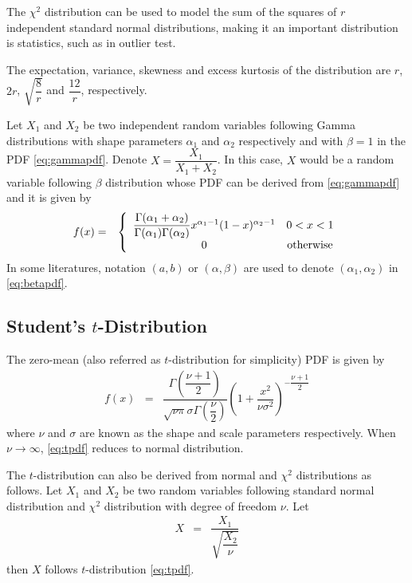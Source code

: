 The $\chi^2$ distribution can be used to model the sum of the squares of $r$ independent standard normal distributions, making it an important distribution is statistics, such as in outlier test. 

The expectation, variance, skewness and excess kurtosis of the distribution are $r$, $2r$, $\sqrt{\dfrac{8}{r}}$ and $\dfrac{12}{r}$, respectively.

Let $X_1$ and $X_2$ be two independent random variables following Gamma distributions with shape parameters $\alpha_1$ and $\alpha_2$ respectively and with $\beta = 1$ in the PDF \eqref{eq:gammapdf}. Denote $X=\dfrac{X_1}{X_1+X_2}$. In this case, $X$ would be a random variable following $\beta$ distribution whose PDF can be derived from \eqref{eq:gammapdf} and it is given by
\begin{eqnarray}
  f(x) &=& \left\{\begin{array}{cc}
                    \dfrac{\Gamma(\alpha_1 + \alpha_2)}{\Gamma(\alpha_1)\Gamma(\alpha_2)}x^{\alpha_1-1}(1-x)^{\alpha_2-1} & 0 < x < 1 \\
                    0 & \textup{otherwise}
                  \end{array}\right. \label{eq:betapdf}
\end{eqnarray}
In some literatures, notation $(a, b)$ or $(\alpha, \beta)$ are used to denote $(\alpha_1, \alpha_2)$ in \eqref{eq:betapdf}.

\subsection{Student's $t$-Distribution}

The zero-mean  (also referred as $t$-distribution for simplicity) PDF is given by
\begin{eqnarray}
	f(x) &=& \dfrac{\Gamma\left(\dfrac{\nu+1}{2}\right)}{\sqrt{\nu\pi}\sigma\Gamma\left(\dfrac{\nu}{2}\right)}\left(1+\dfrac{x^2}{\nu\sigma^2}\right)^{-\dfrac{\nu+1}{2}} \label{eq:tpdf}
\end{eqnarray}
where $\nu$ and $\sigma$ are known as the shape and scale parameters respectively. When $\nu\rightarrow\infty$, \eqref{eq:tpdf} reduces to normal distribution. 

The $t$-distribution can also be derived from normal and $\chi^2$ distributions as follows. Let $X_1$ and $X_2$ be two random variables following standard normal distribution and $\chi^2$ distribution with degree of freedom $\nu$. Let
\begin{eqnarray}
	X &=& \dfrac{X_1}{\sqrt{\dfrac{X_2}{\nu}}} \nonumber
\end{eqnarray}
then $X$ follows $t$-distribution \eqref{eq:tpdf}.

